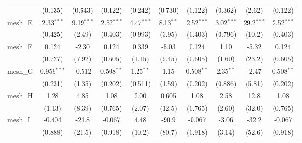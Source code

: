 \begin{tabular}{lccccccccc}
                                                               & (0.135)        & (0.643)        & (0.122)        & (0.242)        & (0.730)       & (0.122)        & (0.362)        & (2.62)         & (0.122)\\   
   mesh\_E                                                     & 2.33$^{***}$   & 9.19$^{***}$   & 2.52$^{***}$   & 4.47$^{***}$   & 8.13$^{**}$   & 2.52$^{***}$   & 3.02$^{***}$   & 29.2$^{***}$   & 2.52$^{***}$\\   
                                                               & (0.425)        & (2.49)         & (0.403)        & (0.993)        & (3.95)        & (0.403)        & (0.796)        & (10.2)         & (0.403)\\   
   mesh\_F                                                     & 0.124          & -2.30          & 0.124          & 0.339          & -5.03         & 0.124          & 1.10           & -5.32          & 0.124\\   
                                                               & (0.727)        & (7.92)         & (0.605)        & (1.15)         & (9.45)        & (0.605)        & (1.60)         & (23.2)         & (0.605)\\   
   mesh\_G                                                     & 0.959$^{***}$  & -0.512         & 0.508$^{**}$   & 1.25$^{**}$    & 1.15          & 0.508$^{**}$   & 2.35$^{**}$    & -2.47          & 0.508$^{**}$\\   
                                                               & (0.231)        & (1.35)         & (0.202)        & (0.511)        & (1.59)        & (0.202)        & (0.886)        & (5.81)         & (0.202)\\   
   mesh\_H                                                     & 1.28           & 4.85           & 1.08           & 2.00           & 0.605         & 1.08           & 2.58           & 12.8           & 1.08\\   
                                                               & (1.13)         & (8.39)         & (0.765)        & (2.07)         & (12.5)        & (0.765)        & (2.60)         & (32.0)         & (0.765)\\   
   mesh\_I                                                     & -0.404         & -24.8          & -0.067         & 4.48           & -90.9         & -0.067         & -3.06          & -32.2          & -0.067\\   
                                                               & (0.888)        & (21.5)         & (0.918)        & (10.2)         & (80.7)        & (0.918)        & (3.14)         & (52.6)         & (0.918)\\   

\end{tabular}
